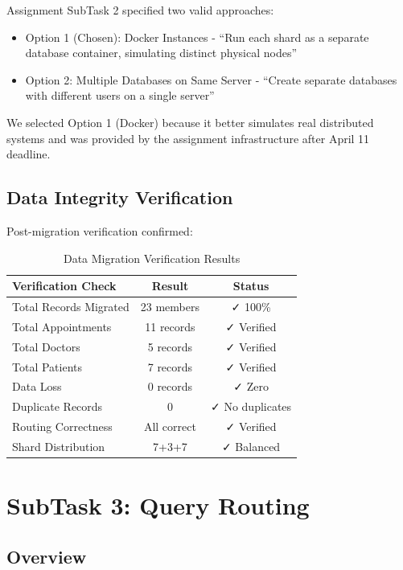 \documentclass[12pt,a4paper]{article}
\begin{document}
Assignment SubTask 2 specified two valid approaches:
\begin{itemize}
    \item Option 1 (Chosen): Docker Instances - ``Run each shard as a separate database container, simulating distinct physical nodes''
    \item Option 2: Multiple Databases on Same Server - ``Create separate databases with different users on a single server''
\end{itemize}

We selected Option 1 (Docker) because it better simulates real distributed systems and was provided by the assignment infrastructure after April 11 deadline.

\subsection{Data Integrity Verification}

Post-migration verification confirmed:

\begin{table}[H]
\centering
\begin{tabularx}{\textwidth}{|l|c|c|}
\hline
\textbf{Verification Check} & \textbf{Result} & \textbf{Status} \\
\hline
Total Records Migrated & 23 members & ✓ 100\% \\
Total Appointments & 11 records & ✓ Verified \\
Total Doctors & 5 records & ✓ Verified \\
Total Patients & 7 records & ✓ Verified \\
Data Loss & 0 records & ✓ Zero \\
Duplicate Records & 0 & ✓ No duplicates \\
Routing Correctness & All correct & ✓ Verified \\
Shard Distribution & 7+3+7 & ✓ Balanced \\
\hline
\end{tabularx}
\caption{Data Migration Verification Results}
\end{table}

\section{SubTask 3: Query Routing}

\subsection{Overview}
\end{document}
